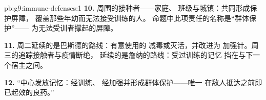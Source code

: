 \begin{solution}{pb:g9:immune-defenses:1}
\textbf{10.} 周围的接种者——家庭、
班级与城镇：共同形成保护屏障，
覆盖那些年幼而无法接受训练的人。
命题中此项责任的名称是“群体保护”——
为无法受训者撑起的屏障。

\textbf{11.} 周二延续的是巴斯德的路线：有意使用的
减毒或灭活，并改进为
加强针。周三的追踪接触者与疫情断绝，
延续的是詹纳的路线：受过训练的记忆
挡在与下一个宿主之间。

\textbf{12.} “中心发放记忆：经训练、
经加强并形成群体保护——唯一
在敌人抵达之前即已起效的良药。”
\end{solution}
